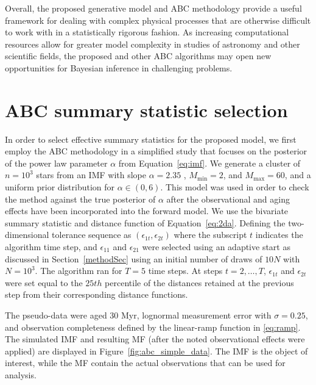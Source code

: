 \documentclass[12pt]{article}
\newcommand{\Mmax}{M_{\text{max}}}
\newcommand{\Mmin}{M_{\text{min}}}
\begin{document}
Overall, the proposed generative model and ABC methodology provide a useful framework for dealing with complex physical processes that are otherwise difficult to work with in a statistically rigorous fashion.
As increasing computational resources allow for greater model complexity in studies of astronomy and other scientific fields, the proposed and other ABC algorithms may open new opportunities for Bayesian inference in challenging problems. 


\appendix
\section{ABC summary statistic selection} \label{app:summary}
In order to select effective summary statistics for the proposed model, we first employ the ABC methodology in a simplified study that focuses on the posterior of the power law parameter $\alpha$ from Equation~\eqref{eq:imf}.  We generate a cluster of $n = 10^3$ stars from an IMF with slope $\alpha = 2.35$  \citep{salpeter55}, $\Mmin = 2$, and $\Mmax = 60$,  and a uniform prior distribution for $\alpha \in (0, 6)$.  
%
This  model was used in order to check the method against the true posterior of $\alpha$ after the observational and aging effects have been incorporated into the forward model.  We use the bivariate summary statistic and distance function of Equation~\eqref{eq:2da}.  Defining the two-dimensional tolerance sequence as $(\epsilon_{1t}, \epsilon_{2t})$ where the subscript $t$ indicates the algorithm time step, and  $\epsilon_{11}$ and $\epsilon_{21}$ were selected using an adaptive start as discussed in Section~\ref{methodSec} using an initial number of draws of $10N$ with $N = 10^3$.  The algorithm ran for $T = 5$ time steps.
At steps $t = 2,\ldots,T$, $\epsilon_{1t}$ and $\epsilon_{2t}$ were set equal to the $25th$ percentile of the distances retained at the previous step from their corresponding distance functions.


The pseudo-data were aged 30 Myr, lognormal measurement error with $\sigma = 0.25$, and observation completeness defined by the linear-ramp function in \eqref{eq:ramp}.  The simulated IMF and resulting MF (after the noted observational effects were applied) are displayed in Figure~\ref{fig:abc_simple_data}.  The IMF is the object of interest, while the MF contain the actual observations that can be used for analysis.
\end{document}
